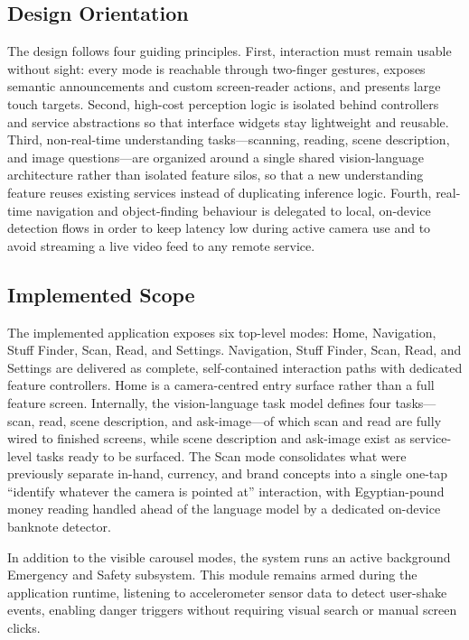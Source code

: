 \documentclass[a4paper]{report}
\begin{document}
\subsection{Design Orientation}
The design follows four guiding principles. First, interaction must remain usable without sight: every mode is reachable through two-finger gestures, exposes semantic announcements and custom screen-reader actions, and presents large touch targets. Second, high-cost perception logic is isolated behind controllers and service abstractions so that interface widgets stay lightweight and reusable. Third, non-real-time understanding tasks---scanning, reading, scene description, and image questions---are organized around a single shared vision-language architecture rather than isolated feature silos, so that a new understanding feature reuses existing services instead of duplicating inference logic. Fourth, real-time navigation and object-finding behaviour is delegated to local, on-device detection flows in order to keep latency low during active camera use and to avoid streaming a live video feed to any remote service.

\subsection{Implemented Scope}
The implemented application exposes six top-level modes: Home, Navigation, Stuff Finder, Scan, Read, and Settings. Navigation, Stuff Finder, Scan, Read, and Settings are delivered as complete, self-contained interaction paths with dedicated feature controllers. Home is a camera-centred entry surface rather than a full feature screen. Internally, the vision-language task model defines four tasks---scan, read, scene description, and ask-image---of which scan and read are fully wired to finished screens, while scene description and ask-image exist as service-level tasks ready to be surfaced. The Scan mode consolidates what were previously separate in-hand, currency, and brand concepts into a single one-tap ``identify whatever the camera is pointed at'' interaction, with Egyptian-pound money reading handled ahead of the language model by a dedicated on-device banknote detector.

In addition to the visible carousel modes, the system runs an active background Emergency and Safety subsystem. This module remains armed during the application runtime, listening to accelerometer sensor data to detect user-shake events, enabling danger triggers without requiring visual search or manual screen clicks.
\end{document}
